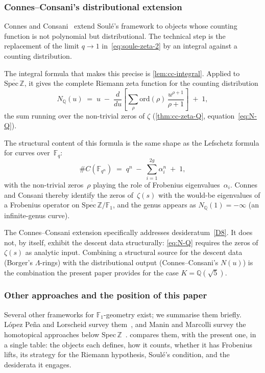 \subsubsection{Connes--Consani's distributional extension}
\label{ssec:cc}

Connes and Consani~\cite{connesconsani10} extend Soul\'e's
framework to objects whose counting function is not polynomial
but distributional.  The technical step is the replacement of the
limit $q\to 1$ in~\eqref{eq:soule-zeta-2} by an integral against
a counting distribution.

The integral formula that makes this precise is \cref{lem:cc-integral}.  Applied to
$\overline{\mathrm{Spec}\,\mathbb{Z}}$, it gives the complete Riemann zeta function for the counting distribution
\[
  N_\mathbb{Q}(u) \;=\; u
  \;-\; \frac{d}{du}\!\left[\sum_{\rho}\mathrm{ord}(\rho)\,\frac{u^{\rho+1}}{\rho+1}\right]
  \;+\; 1,
\]
the sum running over the non-trivial zeros of $\zeta$ (\cref{thm:cc-zeta-Q}, equation~\eqref{eq:N-Q}).

The structural content of this formula is
the same shape as the Lefschetz formula for curves
over~$\mathbb{F}_q$:
\begin{equation}\label{eq:weil-shape}
  \#C(\mathbb{F}_{q^n}) \;=\; q^n
  \;-\; \sum_{i=1}^{2g}\alpha_i^n
  \;+\; 1,
\end{equation}
with the non-trivial zeros~$\rho$ playing the role of Frobenius
eigenvalues~$\alpha_i$.  Connes and Consani thereby identify
the zeros of~$\zeta(s)$ with the would-be eigenvalues of a
Frobenius operator on $\overline{\mathrm{Spec}\,\mathbb{Z}}/\mathbb{F}_1$,
and the genus appears as $N_\mathbb{Q}(1) = -\infty$ \textup{(}an
infinite-genus curve\textup{)}.

The Connes--Consani extension specifically addresses
desideratum~\ref{D8}.  It does not, by itself, exhibit the
descent data structurally: \eqref{eq:N-Q} requires the zeros of
$\zeta(s)$ as analytic input.  Combining a structural source for
the descent data (Borger's $\Lambda$-rings) with the
distributional output (Connes--Consani's $N(u)$) is the
combination the present paper provides for the case
$K=\mathbb{Q}(\sqrt{5})$.

\subsubsection{Other approaches and the position of this paper}
\label{ssec:landscape}

Several other frameworks for $\mathbb{F}_1$-geometry exist; we
summarise them briefly.  L\'opez Pe\~na and Lorscheid survey them~\cite{lopezpena09mapping}, and Manin and
Marcolli survey the homotopical approaches below $\mathrm{Spec}\,\mathbb{Z}$~\cite{maninmarcolli20}.   compares them, with the present one, in a single
table: the objects each defines, how it counts, whether it has Frobenius lifts, its strategy for
the Riemann hypothesis, Soul\'e's condition, and the desiderata it engages.

